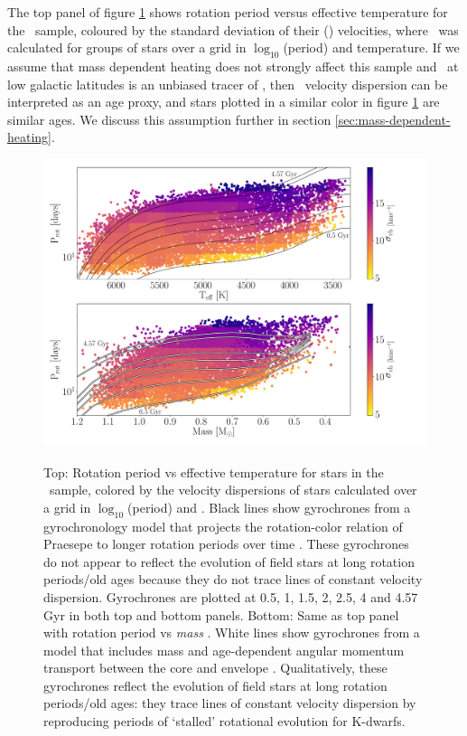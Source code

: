 The top panel of figure \ref{fig:vplot} shows rotation period versus effective
temperature for the \mct\ sample, coloured by the standard deviation of their
(\vb) velocities, where \sigmavb\ was calculated for groups of stars over a
grid in $\log_{10}$(period) and temperature.
If we assume that mass dependent heating does not strongly affect this sample
and \vb\ at low galactic latitudes is an unbiased tracer of \vz, then \vb\
velocity dispersion can be interpreted as an age proxy, and stars plotted in a
similar color in figure \ref{fig:vplot} are similar ages.
We discuss this assumption further in section
\ref{sec:mass-dependent-heating}.
\begin{figure}
  \caption{
    Top: Rotation period vs effective temperature for stars in the \mct\
    sample, colored by the velocity dispersions of stars calculated over a
    grid in $\log_{10}$(period) and \teff.
    Black lines show gyrochrones from a gyrochronology model that projects the
    rotation-color relation of
    Praesepe to longer rotation periods over time \citep{angus2019}.
    These gyrochrones do not appear to reflect the evolution of field stars at
    long rotation periods/old ages because they do not trace lines of constant
    velocity dispersion.
    Gyrochrones are plotted at 0.5, 1, 1.5, 2, 2.5, 4 and 4.57 Gyr in both top
    and bottom panels.
    Bottom: Same as top panel with rotation period vs {\it mass}
    \citep[from][]{berger2020}.
    White lines show gyrochrones from a model that includes mass and
    age-dependent angular momentum transport between the core and envelope
    \citep{spada2019}.
    Qualitatively, these gyrochrones reflect the evolution of field
    stars at long rotation periods/old ages: they trace lines of constant
    velocity dispersion by reproducing periods of `stalled' rotational
    evolution for K-dwarfs.
}
  \centering
    \includegraphics[width=1\textwidth]{main_figure}
\label{fig:vplot}
\end{figure}
